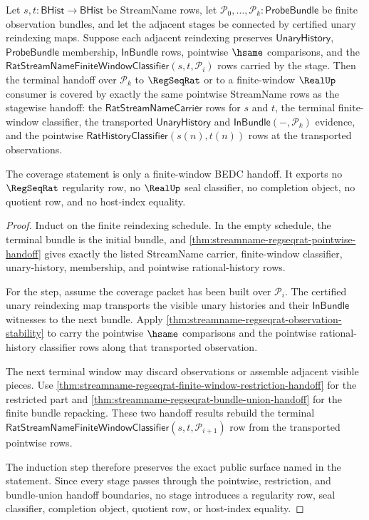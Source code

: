 \begin{theorem}
\label{thm:streamname-regseqrat-pointwise-reindexing-coverage}
Let $s,t:\mathsf{BHist}\to\mathsf{BHist}$ be StreamName rows, let
$\mathcal P_0,\ldots,\mathcal P_k:\mathsf{ProbeBundle}$ be finite observation
bundles, and let the adjacent stages be connected by certified unary
reindexing maps. Suppose each adjacent reindexing preserves
$\mathsf{UnaryHistory}$, $\mathsf{ProbeBundle}$ membership, $\mathsf{InBundle}$
rows, pointwise $\hsame$ comparisons, and the
$\mathsf{RatStreamNameFiniteWindowClassifier}(s,t,\mathcal P_i)$ rows carried by
the stage. Then the terminal handoff over $\mathcal P_k$ to $\RegSeqRat$ or to a
finite-window $\RealUp$ consumer is covered by exactly the same pointwise
StreamName rows as the stagewise handoff: the $\mathsf{RatStreamNameCarrier}$
rows for $s$ and $t$, the terminal finite-window classifier, the transported
$\mathsf{UnaryHistory}$ and $\mathsf{InBundle}(-,\mathcal P_k)$ evidence, and the
pointwise $\mathsf{RatHistoryClassifier}(s(n),t(n))$ rows at the transported
observations.

The coverage statement is only a finite-window BEDC handoff. It exports no
$\RegSeqRat$ regularity row, no $\RealUp$ seal classifier, no completion object,
no quotient row, and no host-index equality.
\end{theorem}
\begin{proof}
Induct on the finite reindexing schedule. In the empty schedule, the terminal
bundle is the initial bundle, and
\autoref{thm:streamname-regseqrat-pointwise-handoff} gives exactly the listed
StreamName carrier, finite-window classifier, unary-history, membership, and
pointwise rational-history rows.

For the step, assume the coverage packet has been built over $\mathcal P_i$.
The certified unary reindexing map transports the visible unary histories and
their $\mathsf{InBundle}$ witnesses to the next bundle. Apply
\autoref{thm:streamname-regseqrat-observation-stability} to carry the pointwise
$\hsame$ comparisons and the pointwise rational-history classifier rows along
that transported observation.

The next terminal window may discard observations or assemble adjacent visible
pieces. Use \autoref{thm:streamname-regseqrat-finite-window-restriction-handoff}
for the restricted part and
\autoref{thm:streamname-regseqrat-bundle-union-handoff} for the finite bundle
repacking. These two handoff results rebuild the terminal
$\mathsf{RatStreamNameFiniteWindowClassifier}(s,t,\mathcal P_{i+1})$ row from
the transported pointwise rows.

The induction step therefore preserves the exact public surface named in the
statement. Since every stage passes through the pointwise, restriction, and
bundle-union handoff boundaries, no stage introduces a regularity row, seal
classifier, completion object, quotient row, or host-index equality.
\end{proof}

